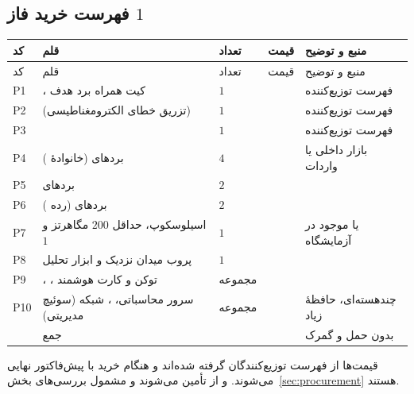 \subsection{فهرست خرید فاز $1$}
\label{sub:p1buy}
\begin{longtable}{C{0.88cm}R{5.47cm}C{0.78cm}C{2.44cm}R{4.59cm}}
\toprule {} کد & قلم & تعداد & قیمت & منبع و توضیح \\ \midrule
\endfirsthead
\toprule {} کد & قلم & تعداد & قیمت & منبع و توضیح \\ \midrule
\endhead
P1 & ، کیت همراه برد هدف  & $1$ &  & فهرست توزیع‌کننده \\
P2 &  (تزریق خطای الکترومغناطیسی) & $1$ &  & فهرست توزیع‌کننده \\
P3 &  & $1$ &  & فهرست توزیع‌کننده \\
P4 & بردهای  (خانوادهٔ ) & $4$ &  & بازار داخلی یا واردات \\
P5 & بردهای  & $2$ &  & \lr{--} \\
P6 & بردهای  (رده ) & $2$ &  & \lr{--} \\
P7 & اسیلوسکوپ، حداقل $200$ مگاهرتز و $1$  & $1$ &  & یا موجود در آزمایشگاه \\
P8 & پروب میدان نزدیک و ابزار تحلیل & $1$ &  & \lr{--} \\
P9 & ، ، توکن و کارت هوشمند & مجموعه &  & \lr{--} \\
P10 & سرور محاسباتی، ، شبکه (سوئیچ مدیریتی) & مجموعه &  &  چندهسته‌ای، حافظهٔ زیاد \\
\midrule & جمع &  &  & بدون حمل و گمرک \\
\bottomrule\end{longtable}
قیمت‌ها از فهرست توزیع‌کنندگان گرفته شده‌اند و هنگام خرید با پیش‌فاکتور نهایی می‌شوند.  و  از  تأمین می‌شوند و مشمول بررسی‌های بخش~\ref{sec:procurement} هستند.

